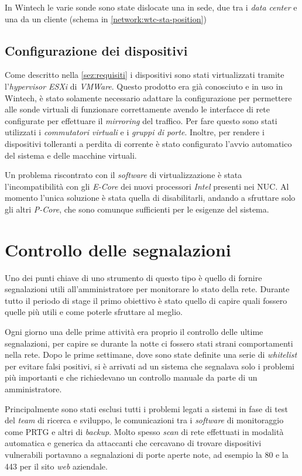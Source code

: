 In Wintech le varie sonde sono state dislocate una in sede, due tra i \emph{data center} e una da un cliente (schema in \autoref{network:wtc-sta-position})

\subsection{Configurazione dei dispositivi}

Come descritto nella \autoref{sez:requisiti} i dispositivi sono stati virtualizzati tramite l'\emph{hypervisor ESXi} di \emph{VMWare}. Questo prodotto era già conosciuto e in uso in Wintech, è stato solamente necessario adattare la configurazione per permettere alle sonde virtuali di funzionare correttamente avendo le interfacce di rete configurate per effettuare il \emph{mirroring} del traffico. Per fare questo sono stati utilizzati i \emph{commutatori virtuali} e i \emph{gruppi di porte}. Inoltre, per rendere i dispositivi tolleranti a perdita di corrente è stato configurato l'avvio automatico del sistema e delle macchine virtuali.

Un problema riscontrato con il \emph{software} di virtualizzazione è stata l'incompatibilità con gli \emph{E-Core} dei nuovi processori \emph{Intel} presenti nei NUC. Al momento l'unica soluzione è stata quella di disabilitarli, andando a sfruttare solo gli altri \emph{P-Core}, che sono comunque sufficienti per le esigenze del sistema.

\section{Controllo delle segnalazioni}

Uno dei punti chiave di uno strumento di questo tipo è quello di fornire segnalazioni utili all'amministratore per monitorare lo stato della rete. Durante tutto il periodo di stage il primo obiettivo è stato quello di capire quali fossero quelle più utili e come poterle sfruttare al meglio.

Ogni giorno una delle prime attività era proprio il controllo delle ultime segnalazioni, per capire se durante la notte ci fossero stati strani comportamenti nella rete. Dopo le prime settimane, dove sono state definite una serie di \emph{whitelist} per evitare falsi positivi, si è arrivati ad un sistema che segnalava solo i problemi più importanti e che richiedevano un controllo manuale da parte di un amministratore.

Principalmente sono stati esclusi tutti i problemi legati a sistemi in fase di test del \emph{team} di ricerca e sviluppo, le comunicazioni tra i \emph{software} di monitoraggio come PRTG e altri di \emph{backup}. Molto spesso \emph{scan} di rete effettuati in modalità automatica e generica da attaccanti che cercavano di trovare dispositivi vulnerabili portavano a segnalazioni di porte aperte note, ad esempio la 80 e la 443 per il sito \emph{web} aziendale.

